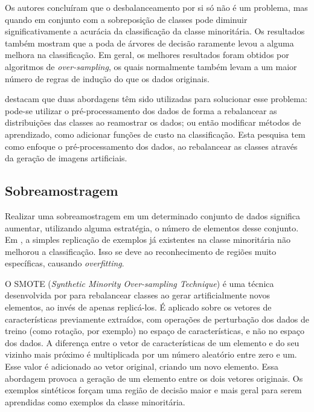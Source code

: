 Os autores concluíram que o desbalanceamento por si só não é um problema, mas quando em conjunto com a sobreposição de classes pode diminuir significativamente a acurácia da classificação da classe minoritária. Os resultados também mostram que a poda de árvores de decisão raramente levou a alguma melhora na classificação. Em geral, os melhores resultados foram obtidos por algoritmos de \textit{over-sampling}, os quais normalmente também levam a um maior número de regras de indução do que os dados originais.


 destacam que duas abordagens têm sido utilizadas para solucionar esse problema: pode-se utilizar o pré-processamento dos dados de forma a rebalancear as distribuições das classes ao reamostrar os dados; ou então modificar métodos de aprendizado, como adicionar funções de custo na classificação. Esta pesquisa tem como enfoque o pré-processamento dos dados, ao rebalancear as classes através da geração de imagens artificiais.

\subsection{Sobreamostragem}
\label{sec:smote}

Realizar uma sobreamostragem em um determinado conjunto de dados significa aumentar, utilizando alguma estratégia, o número de elementos desse conjunto. Em , a simples replicação de exemplos já existentes na classe minoritária não melhorou a classificação. Isso se deve ao reconhecimento de regiões muito específicas, causando \textit{overfitting}.

O SMOTE (\textit{Synthetic Minority Over-sampling Technique}) é uma técnica desenvolvida por  para rebalancear classes ao gerar artificialmente novos elementos, ao invés de apenas replicá-los. É aplicado sobre os vetores de características previamente extraídos, com operações de perturbação dos dados de treino (como rotação, por exemplo) no espaço de características, e não no espaço dos dados. A diferença entre o vetor de características de um elemento e do seu vizinho mais próximo é multiplicada por um número aleatório entre zero e um. Esse valor é adicionado ao vetor original, criando um novo elemento. Essa abordagem provoca a geração de um elemento entre os dois vetores originais. Os exemplos sintéticos forçam uma região de decisão maior e mais geral para serem aprendidas como exemplos da classe minoritária.

